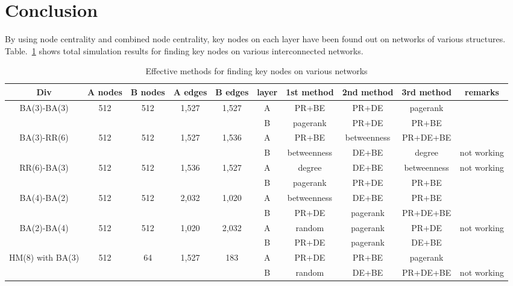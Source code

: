 \section{Conclusion}
By using node centrality and combined node centrality, key nodes on each layer have been found out on networks of various structures. Table.~\ref{effective methods} shows total simulation results for finding key nodes on various interconnected networks. 
\begin{table}[!htb]
	\scriptsize
	\centering
	\caption{Effective methods for finding key nodes on various networks}
	\label{effective methods}
	\begin{center}
		\begin{tabular}{c|c|c|c|c|c|c|c|c|c} \hline\hline
		  Div                              & A nodes & B nodes & A edges & B edges & layer & 1st method & 2nd method  & 3rd method  & remarks    \\ \hline \hline
         \multirow{1}{*}{BA(3)-BA(3)}      & 512 	 & 512     & 1,527   & 1,527   & A     & PR+BE      & PR+DE       & pagerank    &            \\ 
			                               &  	     &         &         &         & B     & pagerank   & PR+DE       & PR+BE       &		     \\ \hline   
	     \multirow{1}{*}{BA(3)-RR(6)}      & 512     & 512     & 1,527   & 1,536   & A     & PR+BE      & betweenness & PR+DE+BE    &            \\
	                                       &         &         &         &         & B     & betweenness& DE+BE       & degree      & not working\\ \hline
	     \multirow{1}{*}{RR(6)-BA(3)}      & 512     & 512     & 1,536   & 1,527   & A     & degree     & DE+BE       & betweenness & not working\\ 
	                                       &         &         &         &         & B     & pagerank   & PR+DE       & PR+BE       &            \\ \hline
		 \multirow{1}{*}{BA(4)-BA(2)}      & 512     & 512     & 2,032   & 1,020   & A     & betweenness& DE+BE       & PR+BE       &            \\ 
		                                   &         &         &         &         & B     & PR+DE      & pagerank    & PR+DE+BE    &            \\ \hline
		 \multirow{1}{*}{BA(2)-BA(4)}      & 512     & 512     & 1,020   & 2,032   & A     & random     & pagerank    & PR+DE       & not working\\ 
		                                   &         &         &         &         & B     & PR+DE      & pagerank    & DE+BE       &            \\ \hline
		 \multirow{1}{*}{HM(8) with BA(3)} & 512     & 64      & 1,527   & 183     & A     & PR+DE      & PR+BE       & pagerank    &            \\ 
		                                   &         &         &         &         & B     & random     & DE+BE       & PR+DE+BE    & not working\\ \hline
			\hline
		\end{tabular}
	\end{center}
\end{table}
